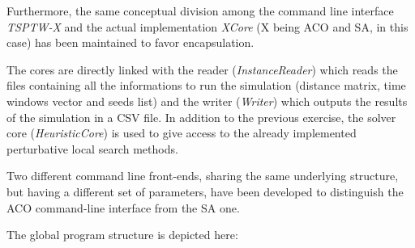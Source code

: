 \documentclass{article}
\newcommand{\component}[2]{node (p#1) [component]
  {{\scriptsize\textit{#2}}}}
\newcommand{\backgroundSquare}[5]{%
  \begin{pgfonlayer}{background}
    \path (#1.west |- #2.north)+(-0.5,0.5) node (a1) {};
    \path (#3.east |- #4.south)+(+0.5,-0.25) node (a2) {};
    \path[fill=blue!20,rounded corners, draw=black!50, dashed]
      (a1) rectangle (a2);
    \path (a1.east |- a1.south)+(0.8,-0.3) node (u1)[texto]
      {\scriptsize\textit{#5 Tier}};
  \end{pgfonlayer}}
\begin{document}
Furthermore, the same conceptual division among the command line interface \emph{TSPTW-X} and the actual implementation \emph{XCore} (X being ACO and SA, in this case) has been maintained to favor encapsulation.

The cores are directly linked with the reader (\emph{InstanceReader}) which reads the files containing all the informations to run the simulation (distance matrix, time windows vector and seeds list) and the writer (\emph{Writer}) which outputs the results of the simulation in a CSV file.
In addition to the previous exercise, the solver core (\emph{HeuristicCore}) is used to give access to the already implemented perturbative local search methods.

Two different command line front-ends, sharing the same underlying structure, but having a different set of parameters, have been developed to distinguish the ACO command-line interface from the SA one. 

The global program structure is depicted here:

\begin{center}
\end{center}
\end{document}
